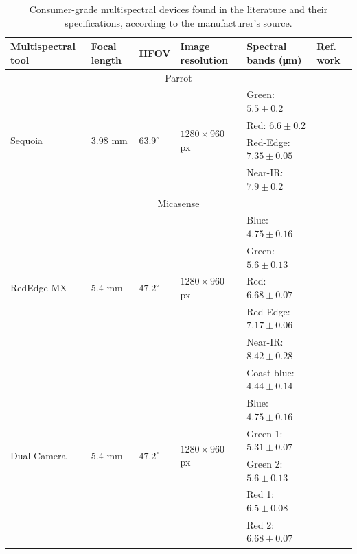 \renewcommand{\arraystretch}{1.2}
\begin{table}[h!]
    \caption{Consumer-grade multispectral devices found in the literature and their specifications, according to the manufacturer's source.}
    \label{table:multispectral_devices}
    \begin{tabular}{llllll}
        \toprule
        Multispectral tool & Focal length & HFOV & Image resolution & Spectral bands (\si{\micro\meter}) & Ref. work \\
        \midrule
        \multicolumn{6}{c}{Parrot}\\
        \cmidrule{1-6}
        \multirow{4}{*}{Sequoia}     & \multirow{4}{*}{3.98 \si{\milli\meter}}   & \multirow{4}{*}{$63.9^{\circ}$}  & \multirow{4}{*}{$1280 \times 960$ px}  & Green: $5.5 \pm 0.2$  & \multirow{4}{*}{\cite{franzini_geometric_2019}}\\
        & & & & Red: $6.6 \pm 0.2$ &\\
        & & & & Red-Edge: $7.35 \pm 0.05$ &\\
        & & & & Near-IR: $7.9 \pm 0.2$ &\\
        \cmidrule{1-6}
        \multicolumn{6}{c}{Micasense}\\
        \cmidrule{1-6}
        \multirow{5}{*}{RedEdge-MX}     & \multirow{5}{*}{5.4 \si{\milli\meter}}   & \multirow{5}{*}{$47.2^{\circ}$}  & \multirow{5}{*}{$1280 \times 960$ px}  & Blue: $4.75 \pm 0.16$     & \multirow{5}{*}{\cite{cunha_prediction_2021, isgro_unmanned_2021}}\\
        & & & & Green: $5.6 \pm 0.13$ &\\
        & & & & Red: $6.68 \pm 0.07$ &\\
        & & & & Red-Edge: $7.17 \pm 0.06$ &\\
        & & & & Near-IR: $8.42 \pm 0.28$ &\\
        \cmidrule{1-6}
        \multirow{10}{*}{Dual-Camera}     & \multirow{10}{*}{5.4 \si{\milli\meter}}   & \multirow{10}{*}{$47.2^{\circ}$}  & \multirow{10}{*}{$1280 \times 960$ px} & Coast blue: $4.44 \pm 0.14$    & \multirow{10}{*}{\cite{chakhvashvili_comparison_2021}}\\
        & & & & Blue: $4.75 \pm 0.16$ &\\
        & & & & Green 1: $5.31 \pm 0.07$ &\\
        & & & & Green 2: $5.6 \pm 0.13$ &\\
        & & & & Red 1: $6.5 \pm 0.08$ &\\
        & & & & Red 2: $6.68 \pm 0.07$ &\\

\end{tabular}
\end{table}
